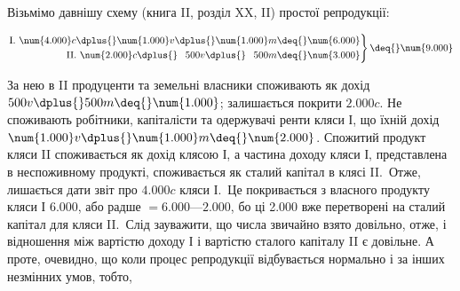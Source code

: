 Візьмімо давнішу схему (книга II, розділ XX, II) простої репродукції:

\begin{center}
\[
 \left.\begin{aligned}
        \text{I. }\num{4.000} c \dplus{} \num{1.000} v \dplus{} \num{1.000} m \deq{} \num{6.000}\\
        \text{II. }\num{2.000} c \dplus{} \phantom{0.}500 v \dplus{} \phantom{0.}500 m \deq{} \num{3.000}
       \end{aligned}
 \right\}
  \deq{} \num{9.000}
\]
\end{center}
За нею в II продуценти та земельні власники споживають як дохід
$500 v \dplus{} 500 m \deq{} \num{1.000}$; залишається покрити $\num{2.000} c$. Не споживають
робітники, капіталісти та одержувачі ренти кляси І, що їхній дохід \deq{}
$\num{1.000} v \dplus{} \num{1.000} m \deq{} \num{2.000}$. Спожитий продукт кляси II споживається як дохід
клясою І, а частина доходу кляси І, представлена в неспоживному продукті,
споживається як сталий капітал в клясі II.~Отже, лишається дати звіт про
$\num{4.000} c$ кляси І.~Це покривається з власного продукту кляси І \deq{} \num{6.000}, або радше
$= \num{6.000} — \num{2.000}$, бо ці \num{2.000} вже перетворені на сталий капітал для кляси II.~Слід
зауважити, що числа звичайно взято довільно, отже, і відношення між вартістю
доходу І і вартістю сталого капіталу II є довільне. А проте, очевидно, що коли
процес репродукції відбувається нормально і за інших незмінних умов, тобто,
\parbreak{}  %
